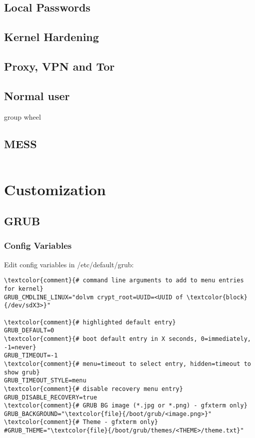 \documentclass[10pt, a4paper, onecolumn, openany]{book}         %
\begin{document}
\section{Local Passwords}

\section{Kernel Hardening}

\section{Proxy, VPN and Tor}

\section{Normal user}
group wheel

\section{MESS}
\begin{Verbatim}[commandchars=\\\{\}]

\end{Verbatim}






\chapter{Customization}
\label{grub.conf}
\section{GRUB}
\subsection{Config Variables}
Edit config variables in \textcolor{file}{/etc/default/grub}:
\begin{Verbatim}[commandchars=\\\{\}]
\textcolor{comment}{# command line arguments to add to menu entries for kernel}
GRUB_CMDLINE_LINUX="dolvm crypt_root=UUID=<UUID of \textcolor{block}{/dev/sdX3>}"

\textcolor{comment}{# highlighted default entry}
GRUB_DEFAULT=0
\textcolor{comment}{# boot default entry in X seconds, 0=immediately, -1=never}
GRUB_TIMEOUT=-1
\textcolor{comment}{# menu=timeout to select entry, hidden=timeout to show grub}
GRUB_TIMEOUT_STYLE=menu
\textcolor{comment}{# disable recovery menu entry}
GRUB_DISABLE_RECOVERY=true
\textcolor{comment}{# GRUB BG image (*.jpg or *.png) - gfxterm only}
GRUB_BACKGROUND="\textcolor{file}{/boot/grub/<image.png>}"
\textcolor{comment}{# Theme - gfxterm only}
#GRUB_THEME="\textcolor{file}{/boot/grub/themes/<THEME>/theme.txt}"
\end{Verbatim}
\end{document}
